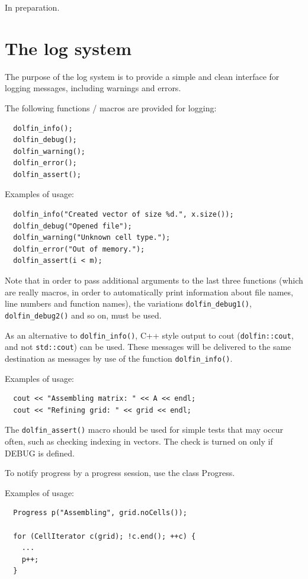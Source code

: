 \documentclass[12pt]{article}
\begin{document}
In preparation.

\cleardoublepage
\section{The log system}

The purpose of the log system is to provide a simple and
clean interface for logging messages, including warnings
and errors.

The following functions / macros are provided for logging:

\begin{verbatim}
  dolfin_info();
  dolfin_debug();
  dolfin_warning();
  dolfin_error();
  dolfin_assert();
\end{verbatim}

Examples of usage:

\begin{verbatim}
  dolfin_info("Created vector of size %d.", x.size());
  dolfin_debug("Opened file");
  dolfin_warning("Unknown cell type.");
  dolfin_error("Out of memory.");
  dolfin_assert(i < m);
\end{verbatim}

Note that in order to pass additional arguments to the last
three functions (which are really macros, in order to
automatically print information about file names, line numbers
and function names), the variations \texttt{dolfin\_debug1()},
\texttt{dolfin\_debug2()} and so on, must be used.

As an alternative to \texttt{dolfin\_info()}, C++ style output to cout
(\texttt{dolfin::cout}, and not \texttt{std::cout}) can be used. These messages
will be delivered to the same destination as messages by use
of the function \texttt{dolfin\_info()}.

Examples of usage:

\begin{verbatim}
  cout << "Assembling matrix: " << A << endl;
  cout << "Refining grid: " << grid << endl;
\end{verbatim}

The \texttt{dolfin\_assert()} macro should be used for simple tests that
may occur often, such as checking indexing in vectors. The check
is turned on only if DEBUG is defined.

To notify progress by a progress session, use the class
Progress.

Examples of usage:

\begin{verbatim}
  Progress p("Assembling", grid.noCells());
  
  for (CellIterator c(grid); !c.end(); ++c) {
    ...
    p++;
  }
\end{verbatim}
\end{document}
